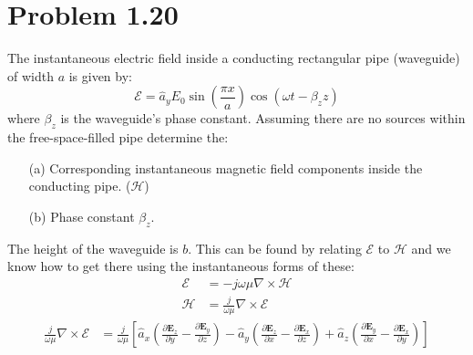 \documentclass[12pt]{article}
\begin{document}
\section*{Problem 1.20}
The instantaneous electric field inside a conducting rectangular pipe (waveguide) of width \( a \) is given by:
\[
\bm{\mathcal{E}} = \hat{a}_y E_0 \sin\left(\frac{\pi x}{a}\right) \cos(\omega t - \beta_z z)
\]
where \( \beta_z \) is the waveguide's phase constant. Assuming there are no sources within the free-space-filled pipe determine the:
\begin{itemize}
\item[(a)] Corresponding instantaneous magnetic field components inside the conducting pipe. ($\bm{\mathcal{H}}$)\\
\item[(b)] Phase constant \( \beta_z \).
\end{itemize}
The height of the waveguide is \( b \).
This can be found by relating $\bm{\mathcal{E}}$ to $\bm{\mathcal{H}}$ and we know how to get there using the instantaneous forms of these:
\begin{align*}
  \bm{\mathcal{E}} &= -j \omega\mu\nabla \times \bm{\mathcal{H}} \\
  \bm{\mathcal{H}} &= \frac{j}{\omega\mu}\nabla \times \bm{\mathcal{E}}
\end{align*}
\begin{align*}
  \frac{j}{\omega\mu}  \nabla \times \bm{\mathcal{E}} &=  \frac{j}{\omega\mu} \left[\hat a_x\left(\frac{\partial\bm{E}_z}{\partial y} - \frac{\partial\bm{E}_y}{\partial z}\right) - \hat a_y\left( \frac{\partial\bm{E}_z}{\partial x} - \frac{\partial\bm{E}_x}{\partial z}  \right) + \hat a_z\left( \frac{\partial\bm{E}_y}{\partial x} -  \frac{\partial\bm{E}_x}{\partial y}\right)\right]
\end{align*}
\end{document}
